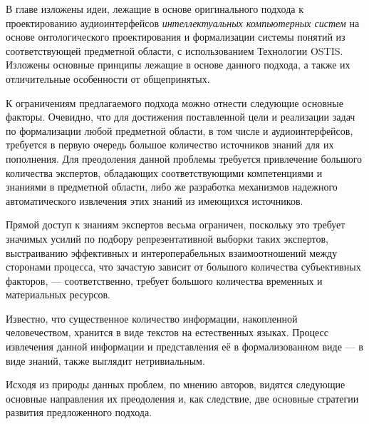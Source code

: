 В главе изложены идеи, лежащие в основе оригинального подхода к проектированию аудиоинтерфейсов \textit{интеллектуальных компьютерных систем} на основе онтологического проектирования и формализации системы понятий из соответствующей предметной области, с использованием Технологии OSTIS. Изложены основные принципы лежащие в основе данного подхода, а также их отличительные особенности от общепринятых.

К ограничениям предлагаемого подхода можно отнести следующие основные факторы. Очевидно, что для достижения поставленной цели и реализации задач по формализации любой предметной области, в том числе и аудиоинтерфейсов, требуется в первую очередь большое количество источников знаний для их пополнения. Для преодоления данной проблемы требуется привлечение большого количества экспертов, обладающих соответствующими компетенциями и знаниями в предметной области, либо же разработка механизмов надежного автоматического извлечения этих знаний из имеющихся источников.

Прямой доступ к знаниям экспертов весьма ограничен, поскольку это требует значимых усилий по подбору репрезентативной выборки таких экспертов, выстраиванию эффективных и интероперабельных взаимоотношений между сторонами процесса, что зачастую зависит от большого количества субъективных факторов, --- соответственно, требует большого количества временных и материальных ресурсов.

Известно, что существенное количество информации, накопленной человечеством, хранится в виде текстов на естественных языках. Процесс извлечения данной информации и представления её в формализованном виде --- в виде знаний, также выглядит нетривиальным.
 
Исходя из природы данных проблем, по мнению авторов, видятся следующие основные направления их преодоления и, как следствие, две основные стратегии развития предложенного подхода.

